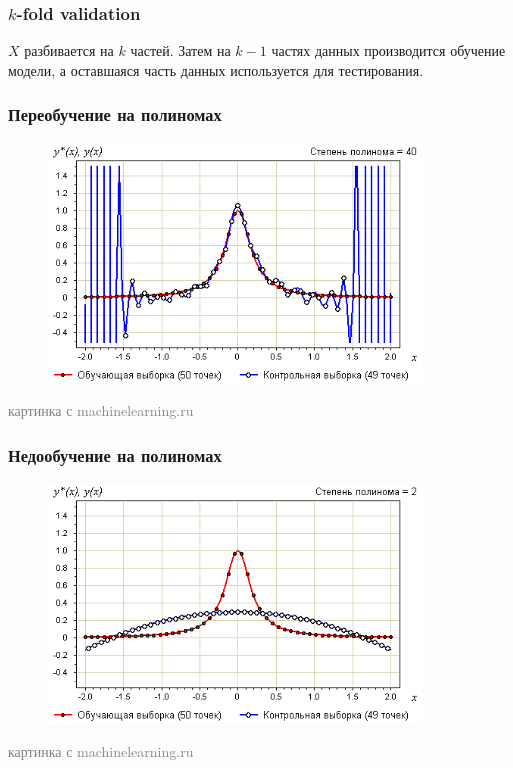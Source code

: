 \documentclass[12pt]{beamer}
\begin{document}
\begin{frame}\frametitle{$k$-fold validation}
$X$ разбивается на $k$ частей. Затем на ${k-1}$ частях данных производится обучение модели, а оставшаяся часть данных используется для тестирования.
\end{frame}

\begin{frame}\frametitle{Переобучение на полиномах}

\begin{figure}[htbp]
\centering
\includegraphics[height=180pt]{overfit}  
\end{figure}

\textcolor{gray}{картинка с machinelearning.ru}

\end{frame}

\begin{frame}\frametitle{Недообучение на полиномах}
\begin{figure}[htbp]
\centering
\includegraphics[height=180pt]{underfit}  
\end{figure}

\textcolor{gray}{картинка с machinelearning.ru}
\end{frame}
\end{document}
